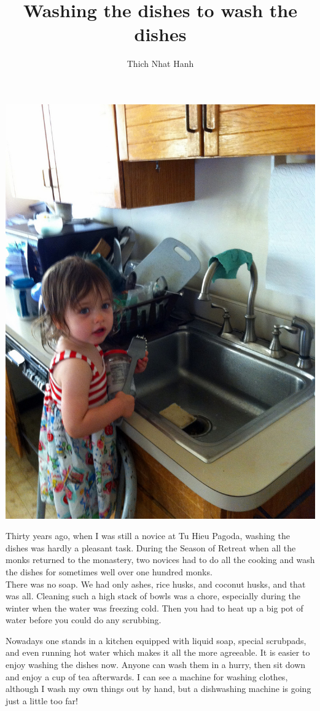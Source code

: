 \documentclass[a4paper,12pt]{article}
\title{Washing the dishes to wash the dishes}
\author{Thich Nhat Hanh}
\begin{document}
 \maketitle
\begin{center}
\includegraphics[scale=0.25]{washingdishes.jpg}
\end{center}
Thirty years ago, when I was still a novice at Tu Hieu Pagoda, washing the 
dishes was hardly a pleasant task. During the Season of Retreat when all the 
monks returned to the monastery, two novices had to do all the cooking and wash 
the dishes for sometimes well over one hundred monks.
\Idots
\\
There was no soap. We had only ashes, rice husks, and coconut husks, and that 
was all. Cleaning such a high stack of bowls was a chore, especially during the 
winter when the water was freezing cold. Then you had to heat up a big pot of 
water before you could do any scrubbing.

Nowadays one stands in a kitchen equipped with liquid soap, special scrubpads, 
and even running hot water which makes it all the more agreeable. It is easier 
to enjoy washing the dishes now. Anyone can wash them in a hurry, then sit down 
and enjoy a cup of tea afterwards. I can see a machine for washing clothes, 
although I wash my own things out by hand, but a dishwashing machine is going 
just a little too far!
\end{document}
